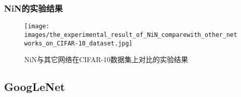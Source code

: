        \subsubsection{NiN的实验结果}
             \begin{figure}[H]
            \centering
            \texttt{[image: images/the\_experimental\_result\_of\_NiN\_comparewith\_other\_networks\_on\_CIFAR-10\_dataset.jpg]}
            \caption{NiN与其它网络在CIFAR-10数据集上对比的实验结果
            }
            \end{figure}


    \subsection{GoogLeNet}
